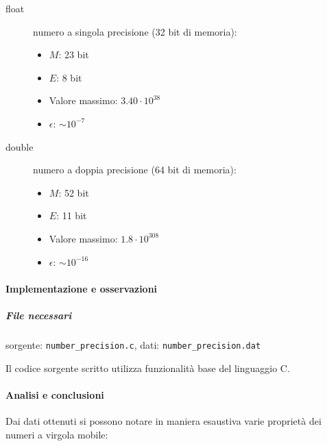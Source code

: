 \begin{description}
	\item[float] numero a singola precisione (32 bit di memoria):
		\begin{itemize}
			\item $M$: 23 bit
			\item $E$: 8 bit
			\item Valore massimo: $3.40 \cdot 10^{38}$
			\item $\epsilon$: $\sim 10^{-7}$
		\end{itemize}
	\item[double] numero a doppia precisione (64 bit di memoria):
		\begin{itemize}
			\item $M$: 52 bit
			\item $E$: 11 bit
			\item Valore massimo: $1.8 \cdot 10^{308}$
			\item $\epsilon$: $\sim 10^{-16}$
		\end{itemize}

\end{description}

\paragraph{Implementazione e osservazioni}

\subparagraph{File necessari} sorgente: \texttt{number\_precision.c}, dati: \texttt{number\_precision.dat}

Il codice sorgente scritto utilizza funzionalità base del linguaggio C. 

\paragraph{Analisi e conclusioni}

Dai dati ottenuti si possono notare in maniera esaustiva varie proprietà dei
numeri a virgola mobile:

